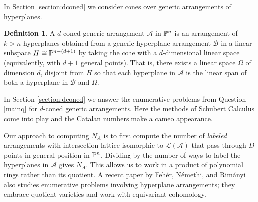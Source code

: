 \documentclass[12pt]{article}
\theoremstyle{plain}
\theoremstyle{definition}
\newtheorem{definition}[theorem]{Definition}
\newcommand{\A}{\mathcal{A}}
\newcommand{\N}{N}
\renewcommand{\L}{\mathcal{L}}
\renewcommand{\P}{\ensuremath \mathbb{P}}
\begin{document}
In Section \ref{section:dconed} we consider cones over generic arrangements of
hyperplanes. 

\begin{definition} \label{dconed} A $d$-coned generic arrangement $\A$
  in $\P^n$ is an arrangement of $k > n$ hyperplanes obtained from a
  generic hyperplane arrangement $\mathcal{B}$ in a linear subspace $H
  \cong \P^{n-(d+1)}$ by taking the cone with a $d$-dimensional linear
  space (equivalently, with $d+1$ general points). That is, there
  exists a linear space $\Omega$ of dimension $d$, disjoint from $H$
  so that each hyperplane in $\A$ is the linear span of both a
  hyperplane in $\mathcal{B}$ and $\Omega$. \end{definition}

In Section \ref{section:dconed} we answer the enumerative problems from Question
\ref{mainq} for $d$-coned generic arrangements. Here the methods of
Schubert Calculus come into play and the Catalan numbers make a cameo
appearance.


Our approach to computing $\N_A$ is to first compute the number of
{\em labeled} arrangements with intersection lattice isomorphic to $\L(\A)$
that pass through $D$ points in general position in $\P^n$. Dividing by
the number of ways to label the hyperplanes in $\A$ gives $\N_A$. This
allows us to work in a product of polynomial rings rather than its
quotient. A recent paper by Feh{\'e}r, N{\'e}methi, and Rim{\'a}nyi
\cite{Rimanyi} also studies enumerative problems involving hyperplane
arrangements; they embrace quotient varieties and work with equivariant
cohomology. 
\end{document}
